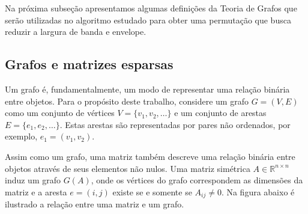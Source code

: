 Na próxima subseção apresentamos algumas definições da Teoria de Grafos que
serão utilizadas no algoritmo estudado para obter uma permutação que busca
reduzir a largura de banda e envelope.

\subsection{Grafos e matrizes esparsas}
Um grafo é, fundamentalmente, um modo de representar uma relação binária entre
objetos. Para o propósito deste trabalho, considere um grafo $G = (V, E)$ como
um conjunto de vértices $V = \{v_1, v_2, \ldots \}$ e um conjunto de
arestas $E = \{e_1, e_2, \ldots \}$. Estas arestas são representadas por pares
não ordenados, por exemplo, $e_1 = (v_1 , v_2)$.

Assim como um grafo, uma matriz também descreve uma relação binária entre objetos
através de seus elementos não nulos. Uma matriz simétrica $A \in \mathbb{R}^{n
\times n}$ induz um grafo $G(A)$, onde os vértices do grafo correspondem as
dimensões da matriz e a aresta $e = (i, j)$ existe se e somente se $A_{ij} \neq 0$.
Na figura abaixo é ilustrado a relação entre uma matriz e um grafo.


